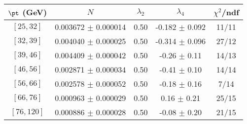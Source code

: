 \begin{tabular}{c||c|c|c|c}
$\pt$ (GeV) & $N$ & $\lambda_{2}$ & $\lambda_4$  & $\chi^2$/ndf  \\
\hline
$[25, 32]$ & 0.003672 $\pm$ 0.000014 & 0.50 & -0.182 $\pm$ 0.092 & 11/11\\
$[32, 39]$ & 0.004040 $\pm$ 0.000025 & 0.50 & -0.314 $\pm$ 0.096 & 27/12\\
$[39, 46]$ & 0.004409 $\pm$ 0.000042 & 0.50 & -0.26 $\pm$ 0.11 & 14/13\\
$[46, 56]$ & 0.002871 $\pm$ 0.000034 & 0.50 & -0.41 $\pm$ 0.10 & 14/14\\
$[56, 66]$ & 0.002578 $\pm$ 0.000052 & 0.50 & -0.18 $\pm$ 0.16 & 7/14\\
$[66, 76]$ & 0.000963 $\pm$ 0.000029 & 0.50 & 0.16 $\pm$ 0.21 & 25/15\\
$[76, 120]$ & 0.000886 $\pm$ 0.000028 & 0.50 & -0.08 $\pm$ 0.20 & 21/15\\
\end{tabular}
